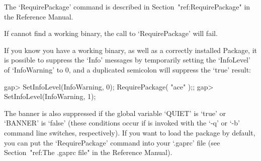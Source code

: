 The      `RequirePackage'      command      is      described       in
Section~"ref:RequirePackage" in the {\GAP} Reference Manual.

If {\GAP} cannot find a working binary, the call  to  `RequirePackage'
will fail.

If you know you have a working {\ACE} binary, as well as  a  correctly
installed {\ACE} Package,  it  is  possible  to  suppress  the  `Info'
messages by temporarily setting the `InfoLevel' of `InfoWarning' to 0,
and a duplicated semicolon will suppress the `true' result:

\beginexample
gap> SetInfoLevel(InfoWarning, 0); RequirePackage( "ace" );;
gap> SetInfoLevel(InfoWarning, 1);
\endexample

The banner is also suppressed if the global {\GAP} variable `QUIET' is
`true' or `BANNER' is `false' (these conditions  occur  if  {\GAP}  is
invoked with the `-q' or `-b' command line switches, respectively). If
you want to load the {\ACE}  package  by  default,  you  can  put  the
`RequirePackage' command into your `.gaprc' file (see Section~"ref:The
.gaprc file" in the {\GAP} Reference Manual).

